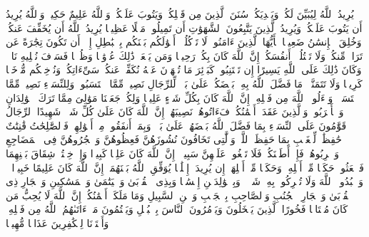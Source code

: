 \stopbuffer%
\startbuffer[\q:4:26]
یُرِیدُ ٱللَّهُ لِیُبَیِّنَ لَكُمۡ وَیَهۡدِیَكُمۡ سُنَنَ ٱلَّذِینَ مِن قَبۡلِكُمۡ وَیَتُوبَ عَلَیۡكُمۡۗ وَٱللَّهُ عَلِیمٌ حَكِیمࣱ%
\stopbuffer%
\startbuffer[\q:4:27]
وَٱللَّهُ یُرِیدُ أَن یَتُوبَ عَلَیۡكُمۡ وَیُرِیدُ ٱلَّذِینَ یَتَّبِعُونَ ٱلشَّهَوَٰتِ أَن تَمِیلُوا۟ مَیۡلًا عَظِیمࣰا%
\stopbuffer%
\startbuffer[\q:4:28]
یُرِیدُ ٱللَّهُ أَن یُخَفِّفَ عَنكُمۡۚ وَخُلِقَ ٱلۡإِنسَٰنُ ضَعِیفࣰا%
\stopbuffer%
\startbuffer[\q:4:29]
یَٰۤأَیُّهَا ٱلَّذِینَ ءَامَنُوا۟ لَا تَأۡكُلُوۤا۟ أَمۡوَٰلَكُم بَیۡنَكُم بِٱلۡبَٰطِلِ إِلَّاۤ أَن تَكُونَ تِجَٰرَةً عَن تَرَاضࣲ مِّنكُمۡۚ وَلَا تَقۡتُلُوۤا۟ أَنفُسَكُمۡۚ إِنَّ ٱللَّهَ كَانَ بِكُمۡ رَحِیمࣰا%
\stopbuffer%
\startbuffer[\q:4:30]
وَمَن یَفۡعَلۡ ذَٰلِكَ عُدۡوَٰنࣰا وَظُلۡمࣰا فَسَوۡفَ نُصۡلِیهِ نَارࣰاۚ وَكَانَ ذَٰلِكَ عَلَى ٱللَّهِ یَسِیرًا%
\stopbuffer%
\startbuffer[\q:4:31]
إِن تَجۡتَنِبُوا۟ كَبَاۤئِرَ مَا تُنۡهَوۡنَ عَنۡهُ نُكَفِّرۡ عَنكُمۡ سَیِّءَاتِكُمۡ وَنُدۡخِلۡكُم مُّدۡخَلࣰا كَرِیمࣰا%
\stopbuffer%
\startbuffer[\q:4:32]
وَلَا تَتَمَنَّوۡا۟ مَا فَضَّلَ ٱللَّهُ بِهِۦ بَعۡضَكُمۡ عَلَىٰ بَعۡضࣲۚ لِّلرِّجَالِ نَصِیبࣱ مِّمَّا ٱكۡتَسَبُوا۟ۖ وَلِلنِّسَاۤءِ نَصِیبࣱ مِّمَّا ٱكۡتَسَبۡنَۚ وَسۡءَلُوا۟ ٱللَّهَ مِن فَضۡلِهِۦۤۚ إِنَّ ٱللَّهَ كَانَ بِكُلِّ شَیۡءٍ عَلِیمࣰا%
\stopbuffer%
\startbuffer[\q:4:33]
وَلِكُلࣲّ جَعَلۡنَا مَوَٰلِیَ مِمَّا تَرَكَ ٱلۡوَٰلِدَانِ وَٱلۡأَقۡرَبُونَۚ وَٱلَّذِینَ عَقَدَتۡ أَیۡمَٰنُكُمۡ فَءَاتُوهُمۡ نَصِیبَهُمۡۚ إِنَّ ٱللَّهَ كَانَ عَلَىٰ كُلِّ شَیۡءࣲ شَهِیدًا%
\stopbuffer%
\startbuffer[\q:4:34]
ٱلرِّجَالُ قَوَّٰمُونَ عَلَى ٱلنِّسَاۤءِ بِمَا فَضَّلَ ٱللَّهُ بَعۡضَهُمۡ عَلَىٰ بَعۡضࣲ وَبِمَاۤ أَنفَقُوا۟ مِنۡ أَمۡوَٰلِهِمۡۚ فَٱلصَّٰلِحَٰتُ قَٰنِتَٰتٌ حَٰفِظَٰتࣱ لِّلۡغَیۡبِ بِمَا حَفِظَ ٱللَّهُۚ وَٱلَّٰتِی تَخَافُونَ نُشُوزَهُنَّ فَعِظُوهُنَّ وَٱهۡجُرُوهُنَّ فِی ٱلۡمَضَاجِعِ وَٱضۡرِبُوهُنَّۖ فَإِنۡ أَطَعۡنَكُمۡ فَلَا تَبۡغُوا۟ عَلَیۡهِنَّ سَبِیلًاۗ إِنَّ ٱللَّهَ كَانَ عَلِیࣰّا كَبِیرࣰا%
\stopbuffer%
\startbuffer[\q:4:35]
وَإِنۡ خِفۡتُمۡ شِقَاقَ بَیۡنِهِمَا فَٱبۡعَثُوا۟ حَكَمࣰا مِّنۡ أَهۡلِهِۦ وَحَكَمࣰا مِّنۡ أَهۡلِهَاۤ إِن یُرِیدَاۤ إِصۡلَٰحࣰا یُوَفِّقِ ٱللَّهُ بَیۡنَهُمَاۤۗ إِنَّ ٱللَّهَ كَانَ عَلِیمًا خَبِیرࣰا%
\stopbuffer%
\startbuffer[\q:4:36]
۞ وَٱعۡبُدُوا۟ ٱللَّهَ وَلَا تُشۡرِكُوا۟ بِهِۦ شَیۡءࣰاۖ وَبِٱلۡوَٰلِدَیۡنِ إِحۡسَٰنࣰا وَبِذِی ٱلۡقُرۡبَىٰ وَٱلۡیَتَٰمَىٰ وَٱلۡمَسَٰكِینِ وَٱلۡجَارِ ذِی ٱلۡقُرۡبَىٰ وَٱلۡجَارِ ٱلۡجُنُبِ وَٱلصَّاحِبِ بِٱلۡجَنۢبِ وَٱبۡنِ ٱلسَّبِیلِ وَمَا مَلَكَتۡ أَیۡمَٰنُكُمۡۗ إِنَّ ٱللَّهَ لَا یُحِبُّ مَن كَانَ مُخۡتَالࣰا فَخُورًا%
\stopbuffer%
\startbuffer[\q:4:37]
ٱلَّذِینَ یَبۡخَلُونَ وَیَأۡمُرُونَ ٱلنَّاسَ بِٱلۡبُخۡلِ وَیَكۡتُمُونَ مَاۤ ءَاتَىٰهُمُ ٱللَّهُ مِن فَضۡلِهِۦۗ وَأَعۡتَدۡنَا لِلۡكَٰفِرِینَ عَذَابࣰا مُّهِینࣰا%
